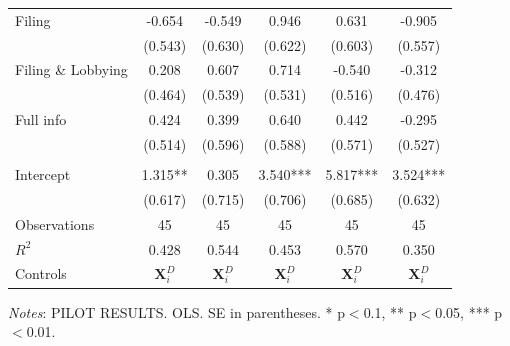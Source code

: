 \documentclass[11pt]{article}
\begin{document}
\begin{table}[!htbp]
\begin{threeparttable}
\begin{tabular}{l|ccccc}
Filing & -0.654 & -0.549 & 0.946 & 0.631 & -0.905 \\
 & (0.543) & (0.630) & (0.622) & (0.603) & (0.557) \\
Filing \& Lobbying & 0.208 & 0.607 & 0.714 & -0.540 & -0.312 \\
 & (0.464) & (0.539) & (0.531) & (0.516) & (0.476) \\
Full info & 0.424 & 0.399 & 0.640 & 0.442 & -0.295 \\
 & (0.514) & (0.596) & (0.588) & (0.571) & (0.527) \\
\\[0.5em]
Intercept & 1.315** & 0.305 & 3.540*** & 5.817*** & 3.524*** \\
 & (0.617) & (0.715) & (0.706) & (0.685) & (0.632) \\
\midrule
Observations & 45 & 45 & 45 & 45 & 45 \\
$R^2$ & 0.428 & 0.544 & 0.453 & 0.570 & 0.350 \\
Controls & $\mathbf{X}_{i}^{D}$ & $\mathbf{X}_{i}^{D}$ & $\mathbf{X}_{i}^{D}$ & $\mathbf{X}_{i}^{D}$ & $\mathbf{X}_{i}^{D}$ \\
\bottomrule
\end{tabular}
\begin{tablenotes}[flushleft]
\footnotesize
\item \textit{Notes}: PILOT RESULTS. OLS. SE in parentheses. * p$<$0.1, ** p$<$0.05, *** p$<$0.01.
\end{tablenotes}
\end{threeparttable}
\end{table}
\end{document}
